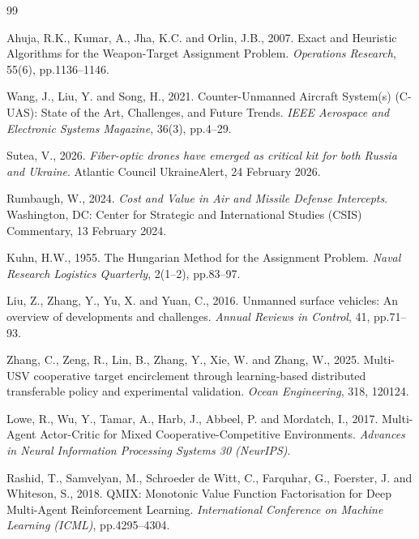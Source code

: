 \begin{thebibliography}{99}
\footnotesize
\setlength{\itemsep}{2pt}

Ahuja, R.K., Kumar, A., Jha, K.C. and Orlin, J.B., 2007.
Exact and Heuristic Algorithms for the Weapon-Target Assignment Problem.
\textit{Operations Research}, 55(6), pp.1136--1146.

Wang, J., Liu, Y. and Song, H., 2021.
Counter-Unmanned Aircraft System(s) (C-UAS): State of the Art, Challenges, and
Future Trends.
\textit{IEEE Aerospace and Electronic Systems Magazine}, 36(3), pp.4--29.

Sutea, V., 2026.
\textit{Fiber-optic drones have emerged as critical kit for both Russia and
Ukraine}. Atlantic Council UkraineAlert, 24 February 2026.

Rumbaugh, W., 2024.
\textit{Cost and Value in Air and Missile Defense Intercepts}.
Washington, DC: Center for Strategic and International Studies (CSIS) Commentary,
13 February 2024.

Kuhn, H.W., 1955.
The Hungarian Method for the Assignment Problem.
\textit{Naval Research Logistics Quarterly}, 2(1--2), pp.83--97.

Liu, Z., Zhang, Y., Yu, X. and Yuan, C., 2016.
Unmanned surface vehicles: An overview of developments and challenges.
\textit{Annual Reviews in Control}, 41, pp.71--93.

Zhang, C., Zeng, R., Lin, B., Zhang, Y., Xie, W. and Zhang, W., 2025.
Multi-USV cooperative target encirclement through learning-based distributed
transferable policy and experimental validation.
\textit{Ocean Engineering}, 318, 120124.

Lowe, R., Wu, Y., Tamar, A., Harb, J., Abbeel, P. and Mordatch, I., 2017.
Multi-Agent Actor-Critic for Mixed Cooperative-Competitive Environments.
\textit{Advances in Neural Information Processing Systems 30 (NeurIPS)}.

Rashid, T., Samvelyan, M., Schroeder de Witt, C., Farquhar, G., Foerster, J. and
Whiteson, S., 2018.
QMIX: Monotonic Value Function Factorisation for Deep Multi-Agent Reinforcement
Learning.
\textit{International Conference on Machine Learning (ICML)}, pp.4295--4304.


\end{thebibliography}
